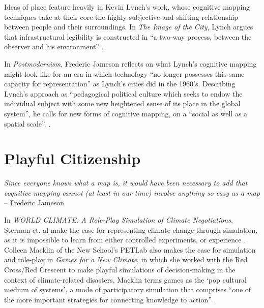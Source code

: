 \documentclass[nofonts,nols,justified,nobib]{tufte-book}
\begin{document}
Ideas of place feature heavily in Kevin Lynch's work, whose cognitive mapping techniques take at their core the highly subjective and shifting relationship between people and their surroundings. In \emph{The Image of the City}, Lynch argues that infrastructural legibility is constructed in ``a two-way process, between the observer and his environment'' \cite{lynch_image_1960}.

In \emph{Postmodernism}, Frederic Jameson reflects on what Lynch's cognitive mapping might look like for an era in which technology ``no longer possesses this same capacity for representation'' as Lynch's cities did in the 1960's. Describing Lynch's approach as ``pedagogical political culture which seeks to endow the individual subject with some new heightened sense of its place in the global system'', he calls for new forms of cognitive mapping, on a ``social as well as a spatial scale''. \cite{jameson_postmodernism_1991}.


\newpage

\section*{Playful Citizenship}

\begin{flushright}
\emph{Since everyone knows what a map is, it would have been necessary to add that cognitive mapping cannot (at least in our time) involve anything so easy as a map}\cite{jameson_postmodernism_1991} \\
-- Frederic Jameson
\end{flushright}

In \emph{WORLD CLIMATE: A Role-Play Simulation of Climate Negotiations}, Sterman et. al make the case for representing climate change through simulation, as it is impossible to learn from either controlled experiments, or experience \cite{sterman_world_2015}. Colleen Macklin of the New School's PETLab also makes the case for simulation and role-play in \emph{Games for a New Climate}, in which she worked with the Red Cross/Red Crescent to make playful simulations of decision-making in the context of climate-related disasters. Macklin terms games as the `pop cultural medium of systems', a mode of participatory simulation that comprises ``one of the more important strategies for connecting knowledge to action'' \cite{macklin_games_2013}. 
\end{document}
